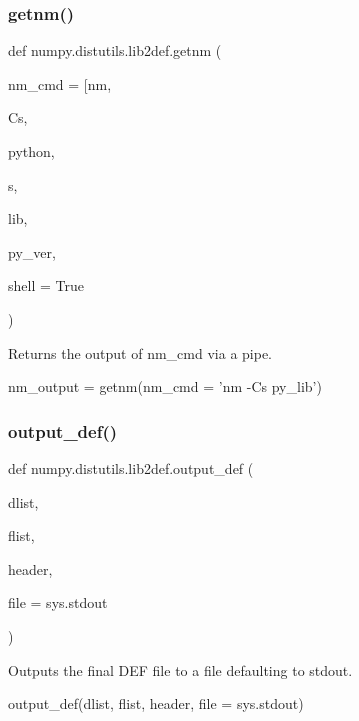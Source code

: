 \subsubsection{\texorpdfstring{getnm()}{getnm()}}
{\footnotesize\ttfamily def numpy.\+distutils.\+lib2def.\+getnm (\begin{DoxyParamCaption}\item[{}]{nm\+\_\+cmd = {\ttfamily \mbox{[}\textquotesingle{}nm\textquotesingle{}},  }\item[{}]{Cs,  }\item[{}]{python,  }\item[{}]{s,  }\item[{}]{lib,  }\item[{}]{py\+\_\+ver,  }\item[{}]{shell = {\ttfamily True} }\end{DoxyParamCaption})}

\begin{DoxyVerb}Returns the output of nm_cmd via a pipe.

nm_output = getnm(nm_cmd = 'nm -Cs py_lib')\end{DoxyVerb}
 \mbox{\label{namespacenumpy_1_1distutils_1_1lib2def_af9f8c10056e760072f68ca2fa1474c3b}} 
\subsubsection{\texorpdfstring{output\+\_\+def()}{output\_def()}}
{\footnotesize\ttfamily def numpy.\+distutils.\+lib2def.\+output\+\_\+def (\begin{DoxyParamCaption}\item[{}]{dlist,  }\item[{}]{flist,  }\item[{}]{header,  }\item[{}]{file = {\ttfamily sys.stdout} }\end{DoxyParamCaption})}

\begin{DoxyVerb}Outputs the final DEF file to a file defaulting to stdout.

output_def(dlist, flist, header, file = sys.stdout)\end{DoxyVerb}
 \mbox{\label{namespacenumpy_1_1distutils_1_1lib2def_afe630e4988f810a2991af3b4fef70f03}} 
